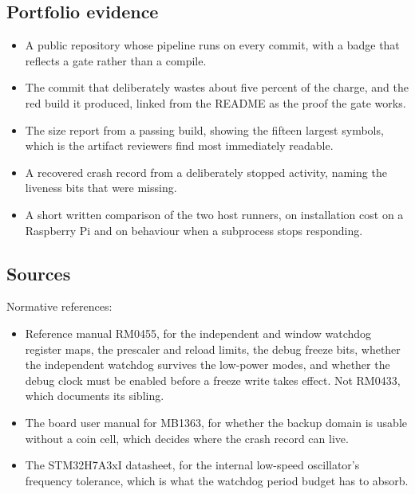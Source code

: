 \subsection*{Portfolio evidence}

\begin{itemize}
\item A public repository whose pipeline runs on every commit, with a badge that
reflects a gate rather than a compile.
\item The commit that deliberately wastes about five percent of the charge, and
the red build it produced, linked from the README as the proof the gate works.
\item The size report from a passing build, showing the fifteen largest symbols,
which is the artifact reviewers find most immediately readable.
\item A recovered crash record from a deliberately stopped activity, naming the
liveness bits that were missing.
\item A short written comparison of the two host runners, on installation cost
on a Raspberry Pi and on behaviour when a subprocess stops responding.
\end{itemize}

\subsection*{Sources}

Normative references:
\begin{itemize}
\item Reference manual RM0455, for the independent and window watchdog register
maps, the prescaler and reload limits, the debug freeze bits, whether the
independent watchdog survives the low-power modes, and whether the debug clock
must be enabled before a freeze write takes effect. Not RM0433, which documents
its sibling.
\item The board user manual for MB1363, for whether the backup domain is usable
without a coin cell, which decides where the crash record can live.
\item The STM32H7A3xI datasheet, for the internal low-speed oscillator's
frequency tolerance, which is what the watchdog period budget has to absorb.
\end{itemize}

